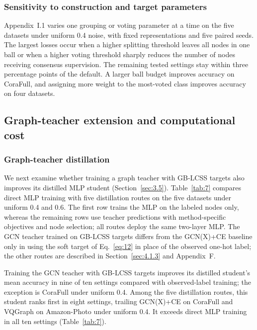 \documentclass[times,review,10pt]{elsarticle}
\theoremstyle{definition}
\theoremstyle{plain}
\begin{document}
\subsubsection{Sensitivity to construction and target parameters}\label{sec:4.3.4}

Appendix~I.1 varies one grouping or voting parameter at a time on the five datasets under uniform 0.4 noise, with fixed representations and five paired seeds. The largest losses occur when a higher splitting threshold leaves all nodes in one ball or when a higher voting threshold sharply reduces the number of nodes receiving consensus supervision. The remaining tested settings stay within three percentage points of the default. A larger ball budget improves accuracy on CoraFull, and assigning more weight to the most-voted class improves accuracy on four datasets.

\subsection{Graph-teacher extension and computational cost}\label{sec:4.4}

\subsubsection{Graph-teacher distillation}\label{sec:4.4.1}

We next examine whether training a graph teacher with GB-LCSS targets also improves its distilled MLP student (Section~\ref{sec:3.5}). Table~\ref{tab:7} compares direct MLP training with five distillation routes on the five datasets under uniform 0.4 and 0.6. The first row trains the MLP on the labeled nodes only, whereas the remaining rows use teacher predictions with method-specific objectives and node selection; all routes deploy the same two-layer MLP. The GCN teacher trained on GB-LCSS targets differs from the GCN(X)+CE baseline only in using the soft target of Eq.~\eqref{eq:12} in place of the observed one-hot label; the other routes are described in Section~\ref{sec:4.1.3} and Appendix~F.

\begin{table}[!t]
\centering
\caption{Test accuracy of deployed MLPs under direct training and graph-to-MLP distillation.}\label{tab:7}

\end{table}

Training the GCN teacher with GB-LCSS targets improves its distilled student's mean accuracy in nine of ten settings compared with observed-label training; the exception is CoraFull under uniform 0.4. Among the five distillation routes, this student ranks first in eight settings, trailing GCN(X)+CE on CoraFull and VQGraph on Amazon-Photo under uniform 0.4. It exceeds direct MLP training in all ten settings (Table~\ref{tab:7}).
\end{document}

